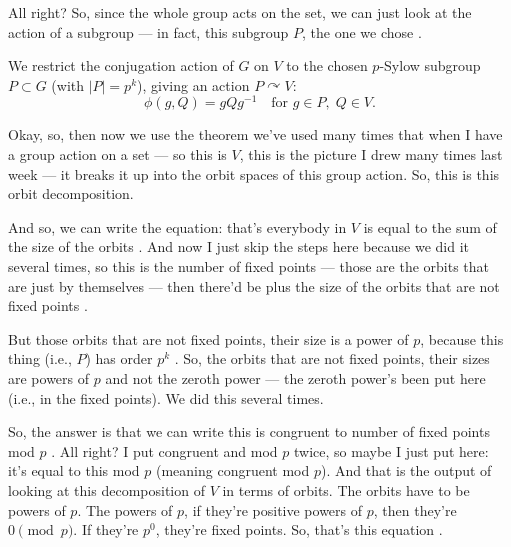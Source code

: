 \begin{proofWrapper}
\begin{speech}[00:04:36 - 00:05:24]
All right? So, since the whole group acts on the set, we can just look at the action of a subgroup --- in fact, this subgroup $P$, the one we chose .
\end{speech}

\begin{content}
We restrict the conjugation action of $G$ on $V$ to the chosen $p$-Sylow subgroup $P \subset G$ (with $|P| = p^k$), giving an action $P \curvearrowright V$:
\[
\phi(g, Q) = g Q g^{-1} \quad \text{for } g \in P, \; Q \in V.
\]
\end{content}

\begin{speech}[00:05:24 - 00:07:01]
Okay, so, then now we use the theorem we've used many times that when I have a group action on a set --- so this is $V$, this is the picture I drew many times last week  --- it breaks it up into the orbit spaces of this group action. So, this is this orbit decomposition.

And so, we can write the equation: that's everybody in $V$ is equal to the sum of the size of the orbits . And now I just skip the steps here because we did it several times, so this is the number of fixed points --- those are the orbits that are just by themselves --- then there'd be plus the size of the orbits that are not fixed points .

But those orbits that are not fixed points, their size is a power of $p$, because this thing (i.e., $P$) has order $p^k$ . So, the orbits that are not fixed points, their sizes are powers of $p$ and not the zeroth power --- the zeroth power's been put here (i.e., in the fixed points). We did this several times.

So, the answer is that we can write this is congruent to number of fixed points mod $p$ . All right? I put congruent and mod $p$ twice, so maybe I just put here: it's equal to this mod $p$ (meaning congruent mod $p$). And that is the output of looking at this decomposition of $V$ in terms of orbits. The orbits have to be powers of $p$. The powers of $p$, if they're positive powers of $p$, then they're $0 \pmod p$. If they're $p^0$, they're fixed points. So, that's this equation .
\end{speech}


\end{proofWrapper}
